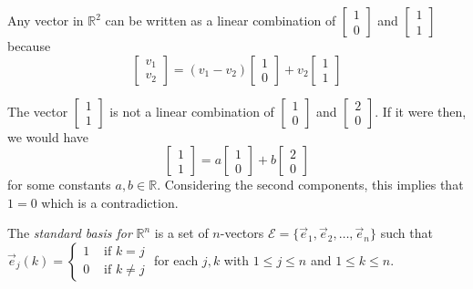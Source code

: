 \begin{example}
Any vector in $\mathbb{R}^2$ can be written as a linear combination of
$\begin{bmatrix}1 \\ 0\end{bmatrix}$ and $\begin{bmatrix}1 \\ 1 \end{bmatrix}$
because
\[
\begin{bmatrix}v_1 \\ v_2\end{bmatrix}=
(v_1-v_2) \begin{bmatrix}1 \\ 0\end{bmatrix}+
v_2 \begin{bmatrix}1 \\ 1 \end{bmatrix}
\]
\end{example}

\begin{example}
The vector $\begin{bmatrix}1 \\ 1\end{bmatrix}$ is not a linear combination
of $\begin{bmatrix}1 \\ 0\end{bmatrix}$ and $\begin{bmatrix}2 \\
0\end{bmatrix}$. If it were then, we would have
\[
\begin{bmatrix}1 \\ 1\end{bmatrix}=
a \begin{bmatrix}1 \\ 0\end{bmatrix}+
b \begin{bmatrix}2 \\ 0 \end{bmatrix}
\]
for some constants $a,b\in \mathbb{R}$. Considering the second components, this
implies that $1=0$ which is a contradiction.
\end{example}

\begin{definition}
The \emph{standard basis for} $\mathbb{R}^n$ is a set of $n$-vectors
$\mathcal{E}=\{\vec{e}_1, \vec{e}_2, \ldots, \vec{e}_n\}$ such that\\
$\vec{e}_j(k)=\begin{cases}
1 & \text{ if } k=j\\
0 & \text{ if } k\neq j
\end{cases}$
for each $j,k$ with $1\le j \le n$ and $1 \le k \le n$.
\end{definition}


